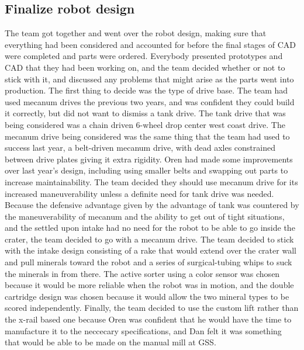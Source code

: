\documentclass{article}
\begin{document}
\subsection{Finalize robot design}
The team got together and went over the robot design, making sure that everything had been considered and accounted for before the final stages of CAD were completed and parts were ordered. Everybody presented prototypes and CAD that they had been working on, and the team decided whether or not to stick with it, and discussed any problems that might arise as the parts went into production. The first thing to decide was the type of drive base. The team had used mecanum drives the previous two years, and was confident they could build it correctly, but did not want to dismiss a tank drive. The tank drive that was being considered was a chain driven 6-wheel drop center west coast drive. The mecanum drive being considered was the same thing that the team had used to success last year, a belt-driven mecanum drive, with dead axles constrained between drive plates giving it extra rigidity. Oren had made some improvements over last year's design, including using smaller belts and swapping out parts to increase maintainability. The team decided they should use mecanum drive for its increased maneuverability unless a definite need for tank drive was needed. Because the defensive advantage given by the advantage of tank was countered by the maneuverability of mecanum and the ability to get out of tight situations, and the settled upon intake had no need for the robot to be able to go inside the crater, the team decided to go with a mecanum drive. The team decided to stick with the intake design consisting of a rake that would extend over the crater wall and pull minerals toward the robot and a series of surgical-tubing whips to suck the minerals in from there. The active sorter using a color sensor was chosen because it would be more reliable when the robot was in motion, and the double cartridge design was chosen because it would allow the two mineral types to be scored independently. Finally, the team decided to use the custom lift rather than the x-rail based one because Oren was confident that he would have the time to manufacture it to the neccecary specifications, and Dan felt it was something that would be able to be made on the manual mill at GSS.
\end{document}
